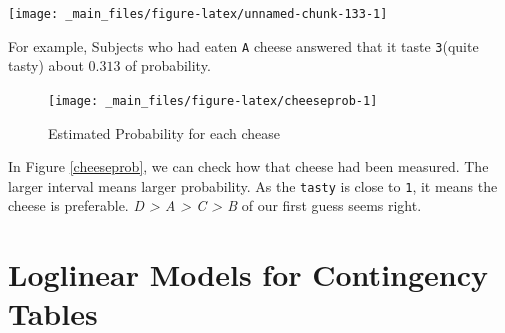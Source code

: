 \documentclass[]{book}
\newenvironment{Shaded}{\begin{snugshade}}{\end{snugshade}}
\newcommand{\DataTypeTok}[1]{\textcolor[rgb]{0.13,0.29,0.53}{#1}}
\newcommand{\DecValTok}[1]{\textcolor[rgb]{0.00,0.00,0.81}{#1}}
\newcommand{\KeywordTok}[1]{\textcolor[rgb]{0.13,0.29,0.53}{\textbf{#1}}}
\newcommand{\NormalTok}[1]{#1}
\newcommand{\OperatorTok}[1]{\textcolor[rgb]{0.81,0.36,0.00}{\textbf{#1}}}
\newcommand{\StringTok}[1]{\textcolor[rgb]{0.31,0.60,0.02}{#1}}
\begin{document}
\begin{center}\texttt{[image: \_main\_files/figure-latex/unnamed-chunk-133-1]} \end{center}

For example, Subjects who had eaten \texttt{A} cheese answered that it taste \texttt{3}(quite tasty) about \(0.313\) of probability.

\begin{Shaded}
\end{Shaded}

\begin{figure}[H]

{\centering \texttt{[image: \_main\_files/figure-latex/cheeseprob-1]} 

}

\caption{Estimated Probability for each chease\label{cheeseprob}}\label{fig:cheeseprob}
\end{figure}

In Figure \ref{cheeseprob}, we can check how that cheese had been measured. The larger interval means larger probability. As the \texttt{tasty} is close to \texttt{1}, it means the cheese is preferable. \emph{D \textgreater{} A \textgreater{} C \textgreater{} B} of our first guess seems right.

\hypertarget{loglinear-models-for-contingency-tables}{%
\chapter{Loglinear Models for Contingency Tables}\label{loglinear-models-for-contingency-tables}}
\end{document}
